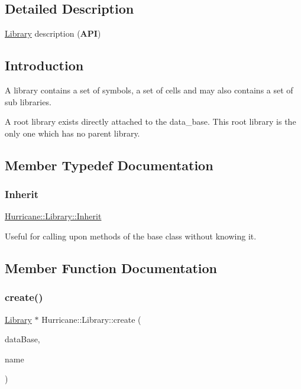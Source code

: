\subsection{Detailed Description}
\hyperlink{classHurricane_1_1Library}{Library} description ({\bfseries A\+PI}) 

\hypertarget{classHurricane_1_1Library_secLibraryIntro}{}\subsection{Introduction}\label{classHurricane_1_1Library_secLibraryIntro}
A library contains a set of symbols, a set of cells and may also contains a set of sub libraries.

A root library exists directly attached to the data\+\_\+base. This root library is the only one which has no parent library. 

\subsection{Member Typedef Documentation}
\mbox{\label{classHurricane_1_1Library_a30ef446b2da0d405bdf4e11ce67b160f}} 
\subsubsection{\texorpdfstring{Inherit}{Inherit}}
{\footnotesize\ttfamily \hyperlink{classHurricane_1_1Library_a30ef446b2da0d405bdf4e11ce67b160f}{Hurricane\+::\+Library\+::\+Inherit}}

Useful for calling upon methods of the base class without knowing it. 

\subsection{Member Function Documentation}
\mbox{\label{classHurricane_1_1Library_af304234d0347128300df5ad09801229d}} 
\subsubsection{\texorpdfstring{create()}{create()}\hspace{0.1cm}{\footnotesize\ttfamily [1/2]}}
{\footnotesize\ttfamily \hyperlink{classHurricane_1_1Library}{Library} $\ast$ Hurricane\+::\+Library\+::create (\begin{DoxyParamCaption}\item[{\hyperlink{classHurricane_1_1DataBase}{Data\+Base} $\ast$}]{data\+Base,  }\item[{const \hyperlink{classHurricane_1_1Name}{Name} \&}]{name }\end{DoxyParamCaption})\hspace{0.3cm}{\ttfamily [static]}}


